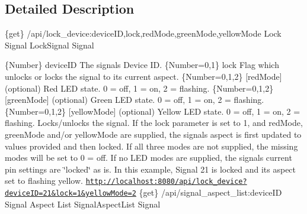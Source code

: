 \subsection{Detailed Description}
\{get\} /api/lock\+\_\+device\+:device\+ID,lock,red\+Mode,green\+Mode,yellow\+Mode Lock Signal  Lock\+Signal  Signal

\{Number\} device\+ID The signal\textquotesingle{}s Device ID.  \{Number=0,1\} lock Flag which unlocks or locks the signal to its current aspect.  \{Number=0,1,2\} \mbox{[}red\+Mode\mbox{]} (optional) Red L\+ED state. 0 = off, 1 = on, 2 = flashing.  \{Number=0,1,2\} \mbox{[}green\+Mode\mbox{]} (optional) Green L\+ED state. 0 = off, 1 = on, 2 = flashing.  \{Number=0,1,2\} \mbox{[}yellow\+Mode\mbox{]} (optional) Yellow L\+ED state. 0 = off, 1 = on, 2 = flashing.  Locks/unlocks the signal. If the lock parameter is set to 1, and red\+Mode, green\+Mode and/or yellow\+Mode are supplied, the signal\textquotesingle{}s aspect is first updated to values provided and then locked. If all three modes are not supplied, the missing modes will be set to 0 = off. If no L\+ED modes are supplied, the signal\textquotesingle{}s current pin settings are \char`\"{}locked\char`\"{} as is.  In this example, Signal 21 is locked and its aspect set to flashing yellow. \href{http://localhost:8080/api/lock_device?deviceID=21&lock=1&yellowMode=2}{\tt http\+://localhost\+:8080/api/lock\+\_\+device?device\+I\+D=21\&lock=1\&yellow\+Mode=2}  \{get\} /api/signal\+\_\+aspect\+\_\+list\+:device\+ID Signal Aspect List  Signal\+Aspect\+List  Signal

